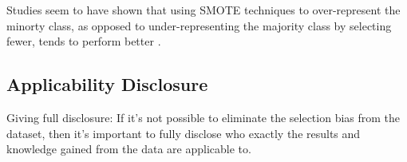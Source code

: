Studies seem to have shown that using SMOTE techniques to over-represent the minorty class, as opposed to under-representing the majority class by selecting fewer, tends to perform better \citep{ChawlaEtAl2002}. 

	\subsection{Applicability Disclosure}
	
	Giving full disclosure: If it's not possible to eliminate the selection bias from the dataset, then it's important to fully disclose who exactly the results and knowledge gained from the data are applicable to.

